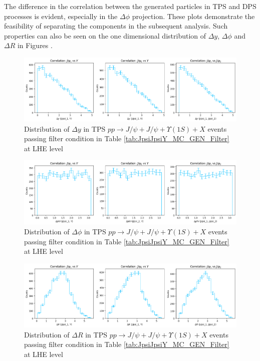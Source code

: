 \documentclass[10pt,twocolumn]{article}
\begin{document}
The difference in the correlation between the generated particles in TPS and DPS processes is evident, especially in the $\Delta \phi$ projection. These plots demonstrate the feasibility of separating the components in the subsequent analysis. Such properties can also be seen on the one dimensional distribution of $\Delta y$, $\Delta \phi$ and $\Delta R$ in Figures .

\begin{figure}
    \centering
    \includegraphics[width=1.0\linewidth]{images/LHE_LEVEL_TPS_DeltaY_filtered.png}
    \caption{Distribution of $\Delta y$ in TPS $pp\to J/\psi+J/\psi+\Upsilon(1S)+X$ events passing filter condition in Table \ref{tab:JpsiJpsiY_MC_GEN_Filter} at LHE level}
    \label{fig:TPS_JJY1S_filtered_DeltaY_LHE}
\end{figure}

\begin{figure}
    \centering
    \includegraphics[width=1.0\linewidth]{images/LHE_LEVEL_TPS_DeltaPhi_filtered.png}
    \caption{Distribution of $\Delta \phi$ in TPS $pp\to J/\psi+J/\psi+\Upsilon(1S)+X$ events passing filter condition in Table \ref{tab:JpsiJpsiY_MC_GEN_Filter} at LHE level}
    \label{fig:TPS_JJY1S_filtered_DeltaPhi_LHE}
\end{figure}

\begin{figure}
    \centering
    \includegraphics[width=1.0\linewidth]{images/LHE_LEVEL_TPS_DeltaR_filtered.png}
    \caption{Distribution of $\Delta R$ in TPS $pp\to J/\psi+J/\psi+\Upsilon(1S)+X$ events passing filter condition in Table \ref{tab:JpsiJpsiY_MC_GEN_Filter} at LHE level}
    \label{fig:TPS_JJY1S_filtered_DeltaR_LHE}
\end{figure}
\end{document}
